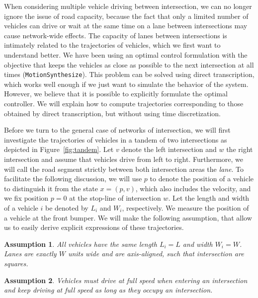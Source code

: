 \documentclass[a4paper]{article}
\theoremstyle{definition}
\theoremstyle{plain}
\newtheorem{assump}{Assumption}[section]
\begin{document}
When considering multiple vehicle driving between intersection, we can no longer
ignore the issue of road capacity, because the fact that only a limited number
of vehicles can drive or wait at the same time on a lane between intersections
may cause network-wide effects.
%
The capacity of lanes between intersections
is intimately related to the trajectories of vehicles, which we first want to
understand better. We have been using an optimal control formulation with the
objective that keeps the vehicles as close as possible to the next intersection
at all times (\texttt{MotionSynthesize}). This problem can be solved using
direct transcription, which works well enough if we just want to simulate the
behavior of the system. However, we believe that it is possible to explicitly
formulate the optimal controller. We will explain how to compute trajectories
corresponding to those obtained by direct transcription, but without using time
discretization.

Before we turn to the general case of networks of intersection, we will first
investigate the trajectories of vehicles in a tandem of two intersections as
depicted in Figure~\ref{fig:tandem}. Let $v$ denote the left intersection and
$w$ the right intersection and assume that vehicles drive from left to right.
Furthermore, we will call the road segment strictly between both intersection
areas the \textit{lane}. To facilitate the following discussion, we will use $p$
to denote the position of a vehicle to distinguish it from the state
$x = (p, v)$, which also includes the velocity, and we fix position $p=0$ at the
stop-line of intersection $w$. Let the length and width of a vehicle $i$ be
denoted by $L_{i}$ and $W_{i}$, respectively. We measure the position of a
vehicle at the front bumper.
%
We will make the following assumption, that allow us to easily derive explicit
expressions of these trajectories.

\begin{assump}
  \label{assump:same_geometry}
  All vehicles have the same length $L_{i} = L$ and width $W_{i} = W$. Lanes
  are exactly $W$ units wide and are axis-aligned, such that intersection are
  squares.
\end{assump}

\begin{assump}
  \label{assump:full_speed}
  Vehicles must drive at full speed when entering an intersection and keep
  driving at full speed as long as they occupy an intersection.
\end{assump}
\end{document}
